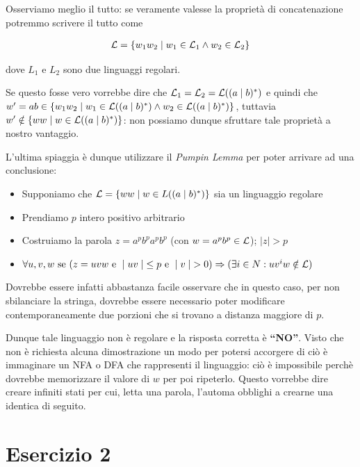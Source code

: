 \documentclass[class=book, crop=false, oneside, 12pt]{standalone}
\begin{document}
Osserviamo meglio il tutto: se veramente valesse la proprietà di concatenazione potremmo scrivere il tutto come 

\begin{align*}
    \mathcal{L} = \{w_1 w_2 \mid w_1 \in \mathcal{L}_1 \land w_2 \in \mathcal{L}_2\}
\end{align*}

dove \(L_1\) e \(L_2\) sono due linguaggi regolari. 

Se questo fosse vero vorrebbe dire che \(\mathcal{L}_1 = \mathcal{L}_2 = \mathcal{L}((a \mid b)^*)\) e quindi che \(w' = ab \in \{w_1 w_2 \mid w_1 \in \mathcal{L}((a \mid b)^*) \land w_2 \in \mathcal{L}((a \mid b)^*)\}\), tuttavia \(w' \notin \{ww \mid w \in \mathcal{L}((a \mid b)^*)\}\): non possiamo dunque sfruttare tale proprietà a nostro vantaggio.

L'ultima spiaggia è dunque utilizzare il \emph{Pumpin Lemma} per poter arrivare ad una conclusione:

\begin{itemize}
    \item Supponiamo che \(\mathcal{L} = \{ww \mid w \in L((a \mid b)^*)\}\) sia un linguaggio regolare
    \item Prendiamo \(p\) intero positivo arbitrario 
    \item Costruiamo la parola \(z = a^pb^pa^pb^p\) (con \(w = a^pb^p \in \mathcal{L}\)); \(\mid z \mid > p\)
    \item \(\forall u, v, w \textrm{ se } (z = uvw \textrm{ e } \mid uv \mid \; \leq p \textrm{ e } \mid v \mid \; > 0) \Rightarrow (\exists i \in N : uv^iw \notin \mathcal{L})\)
\end{itemize}

Dovrebbe essere infatti abbastanza facile osservare che in questo caso, per non sbilanciare la stringa, dovrebbe essere necessario poter modificare contemporaneamente due porzioni che si trovano a distanza maggiore di \(p\). 

Dunque tale linguaggio non è regolare e la risposta corretta è \textbf{“NO”}. Visto che non è richiesta alcuna dimostrazione un modo per potersi accorgere di ciò è immaginare un NFA o DFA che rappresenti il linguaggio: ciò è impossibile perchè dovrebbe memorizzare il valore di \(w\) per poi ripeterlo. Questo vorrebbe dire creare infiniti stati per cui, letta una parola, l'automa obblighi a crearne una identica di seguito. 

\section*{Esercizio 2}
\end{document}
